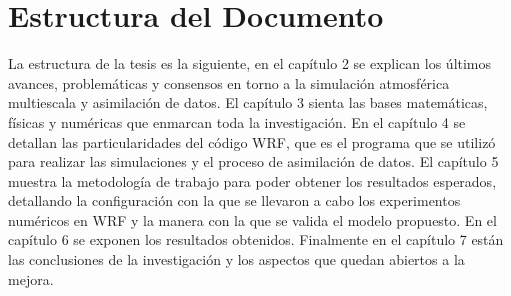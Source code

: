 \section{Estructura del Documento}
La estructura de la tesis es la siguiente, en el capítulo 2 se explican los últimos avances, problemáticas y consensos en torno a la simulación atmosférica multiescala y asimilación de datos. El capítulo 3 sienta las bases matemáticas, físicas y numéricas que enmarcan toda la investigación. En el capítulo 4 se detallan las particularidades del código WRF, que es el programa que se utilizó para realizar las simulaciones y el proceso de asimilación de datos. El capítulo 5 muestra la metodología de trabajo para poder obtener los resultados esperados, detallando la configuración con la que se llevaron a cabo los experimentos numéricos en WRF y la manera con la que se valida el modelo propuesto. En el capítulo 6 se exponen los resultados obtenidos. Finalmente en el capítulo 7 están las conclusiones de la investigación y los aspectos que quedan abiertos a la mejora.
